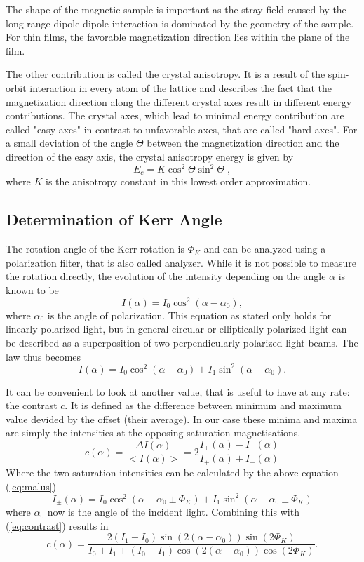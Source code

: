 \documentclass[a4paper]{scrartcl}
\numberwithin{equation}{section}
\numberwithin{figure}{section}
\numberwithin{table}{section}
\newcommand{\eq}[2]{\begin{equation}#1\label{#2}\end{equation}}
\newcommand{\Formel}[1]{(\ref{#1})}
\begin{document}
The shape of the magnetic sample is important as the stray field caused by the long range dipole-dipole interaction is dominated by the geometry of the sample. For thin films, the favorable magnetization direction lies within the plane of the film.

The other contribution is called the crystal anisotropy. It is a result of the spin-orbit interaction in every atom of the lattice and describes the fact that the magnetization direction along the different crystal axes result in different energy contributions. The crystal axes, which lead to minimal energy contribution are called "easy axes" in contrast to unfavorable axes, that are called "hard axes". For a small deviation of the angle $\Theta$ between the magnetization direction and the direction of the easy axis, the crystal anisotropy energy is given by
\eq{E_c=K \cos^2 \Theta \sin^2 \Theta \; , }{eq:aniso}
where $K$ is the anisotropy constant in this lowest order approximation.


\subsection{Determination of Kerr Angle}
The rotation angle of the Kerr rotation is $\Phi_K$ and can be analyzed using a polarization filter, that is also called analyzer. While it is not possible to measure the rotation directly, the evolution of the intensity depending on the angle $\alpha$ is known to be
\eq{I(\alpha)=I_0 \cos^2(\alpha-\alpha_0) ,}{eq:malus}
where $\alpha_0$ is the angle of polarization. This equation as stated only holds for linearly polarized light, but in general circular or elliptically polarized light can be described as a superposition of two perpendicularly polarized light beams. The law thus becomes
\eq{I(\alpha) = I_0 \cos^2(\alpha-\alpha_0) + I_1 \sin^2(\alpha-\alpha_0) .}{}

It can be convenient to look at another value, that is useful to have at any rate: the contrast $c$. It is defined as the difference between minimum and maximum value devided by the offset (their average). In our case these minima and maxima are simply the intensities at the opposing saturation magnetisations.
\eq{c(\alpha)=\frac{\Delta I(\alpha)}{<I(\alpha)>} = 2\frac{I_+(\alpha)-I_-(\alpha)}{I_+(\alpha)+I_-(\alpha)} }{eq:contrast}
Where the two saturation intensities can be calculated by the above equation \Formel{eq:malus}
\eq{I_\pm(\alpha) = I_0 \cos^2(\alpha-\alpha_0\pm\Phi_K) + I_1 \sin^2(\alpha-\alpha_0\pm\Phi_K) }{}
where $\alpha_0$ now is the angle of the incident light. Combining this with \Formel{eq:contrast} results in
\eq{c(\alpha) = \frac{2(I_1-I_0) \sin(2(\alpha-\alpha_0)) \sin(2\Phi_K) } { I_0+I_1+ (I_0-I_1)\cos(2(\alpha-\alpha_0)) \cos(2\Phi_K)} .}{eq:c}
\end{document}

